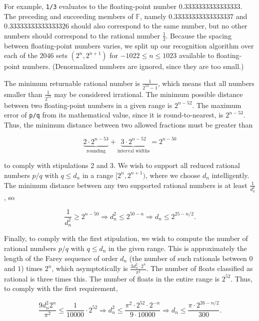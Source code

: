 \documentclass{article}
\newcommand{\finitefp}{\mathbb{F}}
\begin{document}
For example, \texttt{1/3} evaluates to the floating-point number $0.3333333333333333$. The preceding and succeeding members of $\finitefp$, namely $0.33333333333333337$ and $0.33333333333333326$ should also correspond to the same number, but no other numbers should correspond to the rational number $\frac{1}{3}$. Because the spacing between floating-point numbers varies, we split up our recognition algorithm over each of the $2046$ sets $\left(2^n, 2^{n+1}\right)$ for $-1022\leq n\leq 1023$ available to floating-point numbers. (Denormalized numbers are ignored, since they are too small.)

The minimum returnable rational number is $\frac{1}{2^{53}-1}$, which means that all numbers smaller than $\frac{1}{2^{53}}$ may be considered irrational. The minimum possible distance between two floating-point numbers in a given range is $2^{n-52}$. The maximum error of \texttt{p/q} from its mathematical value, since it is round-to-nearest, is $2^{n-53}$. Thus, the minimum distance between two allowed fractions must be greater than

$$\underbrace{2\cdot 2^{n-53}}_{\text{rounding}}+\underbrace{3\cdot 2^{n-52}}_{\text{interval widths}} = 2^{n-50}$$

to comply with stipulations 2 and 3. We wish to support all reduced rational numbers $p/q$ with $q \leq d_n$ in a range $[2^n, 2^{n+1})$, where we choose $d_n$ intelligently. The minimum distance between any two supported rational numbers is at least $\frac{1}{d_n^2}$, so

\begin{equation}
  \frac{1}{d_n^2} \geq 2^{n-50}\Longrightarrow d_n^2 \leq 2^{50-n}\Longrightarrow d_n \leq 2^{25 - n/2}. \label{eq:dn_restriction_1}
\end{equation}

Finally, to comply with the first stipulation, we wish to compute the number of rational numbers $p/q$ with $q \leq d_n$ in the given range. This is approximately the length of the Farey sequence of order $d_n$ (the number of such rationals between $0$ and $1$) times $2^n$, which asymptotically is $\frac{3d_n^2\cdot 2^n}{\pi^2}$. The number of floats classified as rational is three times this. The number of floats in the entire range is $2^{52}$. Thus, to comply with the first requirement,

\begin{equation}
  \frac{9d_n^2 2^n}{\pi^2} \leq \frac{1}{10000}\cdot 2^{52}\Longrightarrow d_n^2 \leq \frac{\pi^2\cdot 2^{52}\cdot 2^{-n}}{9\cdot 10000} \Longrightarrow d_n \leq \frac{\pi\cdot 2^{26 - n/2}}{300}. \label{eq:dn_restriction_2}
\end{equation}
\end{document}
